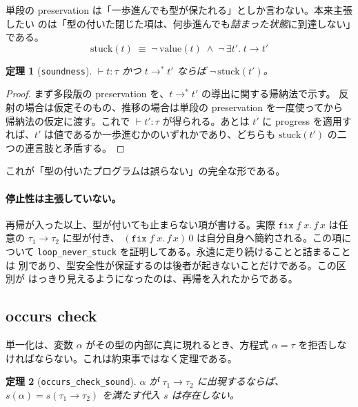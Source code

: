 \documentclass[11pt,a4paper]{ltjsarticle}
\newtheorem{theorem}{定理}
\newcommand{\step}{\longrightarrow}
\begin{document}
単段の preservation は「一歩進んでも型が保たれる」としか言わない。本来主張したい
のは「型の付いた閉じた項は、何歩進んでも\emph{詰まった状態}に到達しない」である。
\[
  \mathrm{stuck}(t) \;\equiv\;
    \neg\,\mathrm{value}(t) \;\land\; \neg\,\exists t'.\; t \step t'
\]

\begin{theorem}[\texttt{soundness}]
  $\vdash t : \tau$ かつ $t \step^{*} t'$ ならば $\neg\,\mathrm{stuck}(t')$。
\end{theorem}

\begin{proof}
まず多段版の preservation を、$t \step^{*} t'$ の導出に関する帰納法で示す。
反射の場合は仮定そのもの、推移の場合は単段の preservation を一度使ってから
帰納法の仮定に渡す。これで $\vdash t' : \tau$ が得られる。あとは $t'$ に
progress を適用すれば、$t'$ は値であるか一歩進むかのいずれかであり、どちらも
$\mathrm{stuck}(t')$ の二つの連言肢と矛盾する。
\end{proof}

これが「型の付いたプログラムは誤らない」の完全な形である。

\paragraph{停止性は主張していない。}
再帰が入った以上、型が付いても止まらない項が書ける。実際
$\mathtt{fix}\;f\;x.\,f\,x$ は任意の $\tau_1 \to \tau_2$ に型が付き、
$(\mathtt{fix}\;f\;x.\,f\,x)\,0$ は自分自身へ簡約される。この項について
\texttt{loop\_never\_stuck} を証明してある。永遠に走り続けることと詰まることは
別であり、型安全性が保証するのは後者が起きないことだけである。この区別が
はっきり見えるようになったのは、再帰を入れたからである。

\subsection{occurs check}

単一化は、変数 $\alpha$ がその型の内部に真に現れるとき、方程式
$\alpha = \tau$ を拒否しなければならない。これは約束事ではなく定理である。

\begin{theorem}[\texttt{occurs\_check\_sound}]
  $\alpha$ が $\tau_1 \to \tau_2$ に出現するならば、
  $s(\alpha) = s(\tau_1 \to \tau_2)$ を満たす代入 $s$ は存在しない。
\end{theorem}
\end{document}
